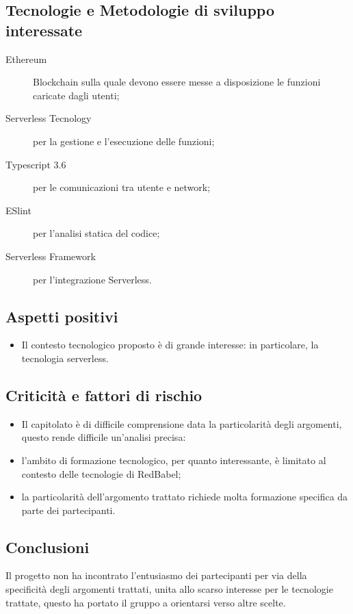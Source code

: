 \documentclass[../studio-di-fattibilita.tex]{subfiles}
\begin{document}
  \subsection{Tecnologie e Metodologie di sviluppo interessate}%
  \label{subsec:tecnologie_interessate}
  \begin{description}
    \item[Ethereum] Blockchain sulla quale devono essere messe a disposizione le funzioni caricate dagli utenti;
    \item[Serverless Tecnology] per la gestione e l'esecuzione delle funzioni;
    \item[Typescript 3.6] per le comunicazioni tra utente e network;
    \item[ESlint] per l'analisi statica del codice;
    \item[Serverless Framework] per l'integrazione Serverless.
  \end{description}
  \subsection{Aspetti positivi}%
  \label{subsec:aspetti_positivi}
  \begin{itemize}
    \item Il contesto tecnologico proposto è di grande interesse: in particolare, la tecnologia serverless.
  \end{itemize}
  \subsection{Criticità e fattori di rischio}%
  \label{subsec:criticita_e_fattori_di_rischio}
  \begin{itemize}
    \item Il capitolato è di difficile comprensione data la particolarità degli argomenti, questo rende difficile un'analisi precisa:
    \item l'ambito di formazione tecnologico, per quanto interessante, è limitato al contesto delle tecnologie di RedBabel;
    \item la particolarità dell'argomento trattato richiede molta formazione specifica da parte dei partecipanti.
  \end{itemize}
  \subsection{Conclusioni}%
  \label{subsec:conclusioni}
  Il progetto non ha incontrato l'entusiasmo dei partecipanti per via della specificità degli argomenti trattati, unita allo scarso interesse per le tecnologie trattate, questo ha portato il gruppo a orientarsi verso altre scelte.
\end{document}
